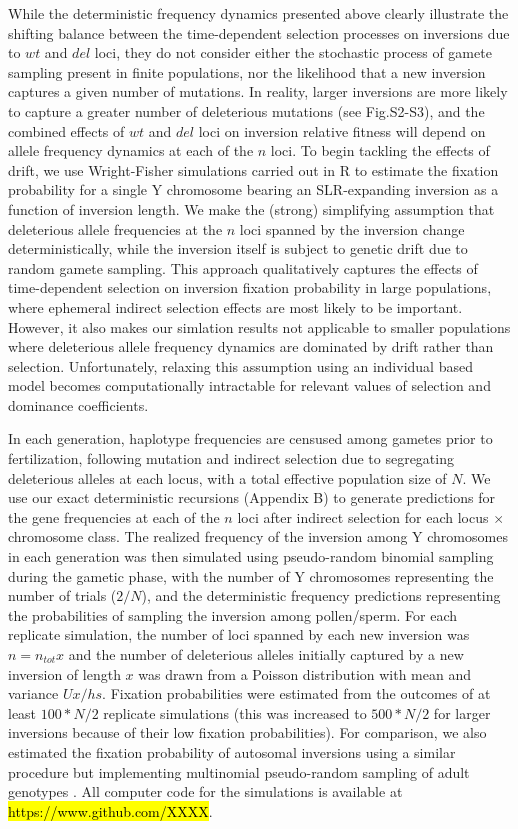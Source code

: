 \documentclass[11pt]{article}
\begin{document}
While the deterministic frequency dynamics presented above clearly illustrate the shifting balance between the time-dependent selection processes on inversions due to $wt$ and $del$ loci, they do not consider either the stochastic process of gamete sampling present in finite populations, nor the likelihood that a new inversion captures a given number of mutations. In reality, larger inversions are more likely to capture a greater number of deleterious mutations (see Fig.S2-S3), and the combined effects of $wt$ and $del$ loci on inversion relative fitness will depend on allele frequency dynamics at each of the $n$ loci. To begin tackling the effects of drift, we use Wright-Fisher simulations carried out in R \citep{RSoftware} to estimate the fixation probability for a single Y chromosome bearing an SLR-expanding inversion as a function of inversion length. We make the (strong) simplifying assumption that deleterious allele frequencies at the $n$ loci spanned by the inversion change deterministically, while the inversion itself is subject to genetic drift due to random gamete sampling. This approach qualitatively captures the effects of time-dependent selection on inversion fixation probability in large populations, where ephemeral indirect selection effects are most likely to be important. However, it also makes our simlation results not applicable to smaller populations where deleterious allele frequency dynamics are dominated by drift rather than selection. Unfortunately, relaxing this assumption using an individual based model becomes computationally intractable for relevant values of selection and dominance coefficients. 

In each generation, haplotype frequencies are censused among gametes prior to fertilization, following mutation and indirect selection due to segregating deleterious alleles at each locus, with a total effective population size of $N$. We use our exact deterministic recursions (Appendix B) to generate predictions for the gene frequencies at each of the $n$ loci after indirect selection for each locus $\times$ chromosome class. The realized frequency of the inversion among Y chromosomes in each generation was then simulated using pseudo-random binomial sampling during the gametic phase, with the number of Y chromosomes representing the number of trials ($2/N$), and the deterministic frequency predictions representing the probabilities of sampling the inversion among pollen/sperm. For each replicate simulation, the number of loci spanned by each new inversion was $n = n_{tot} x$ and the number of deleterious alleles initially captured by a new inversion of length $x$ was drawn from a Poisson distribution with mean and variance $Ux/hs$. Fixation probabilities were estimated from the outcomes of at least $100 \ast N/2$ replicate simulations (this was increased to $500 \ast N/2$ for larger inversions because of their low fixation probabilities). For comparison, we also estimated the fixation probability of autosomal inversions using a similar procedure but implementing multinomial pseudo-random sampling of adult genotypes \citep[e.g.,][pp. 229-230]{Charlesworth2010}. All computer code for the simulations is available at \hl{https://www.github.com/XXXX}.
\end{document}
